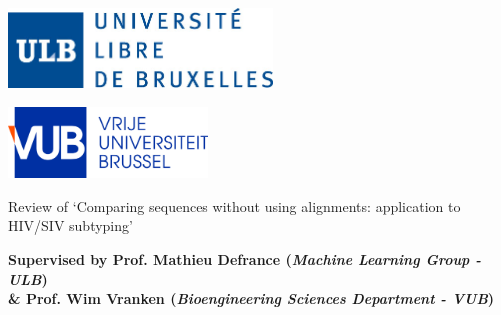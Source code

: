 \documentclass[english,13pt,a4paper]{article}
\theoremstyle{definition}
\theoremstyle{remark}
\begin{document}
\begin{titlepage}
\selectfont

\color{white}

 

\vspace{-5mm} %
\flushright \includegraphics[width=70mm]{logo-ULB.jpg} %

\vspace{-23mm}

\flushleft \includegraphics[height=19mm]{Images/VUB_RGB.png} %




\flushright
\vspace{15mm} %
\color{BleuFonce}
\fontsize{22}{26}\selectfont
Review of `Comparing sequences without using alignments: application to
HIV/SIV subtyping'

\normalsize
\color{black}


\vspace{1.5cm}
\normalsize

\textbf{Supervised by Prof. Mathieu Defrance (\textit{Machine Learning Group - ULB}) \\ \& Prof. Wim Vranken (\textit{Bioengineering Sciences Department - VUB})}


\end{titlepage}
\end{document}
